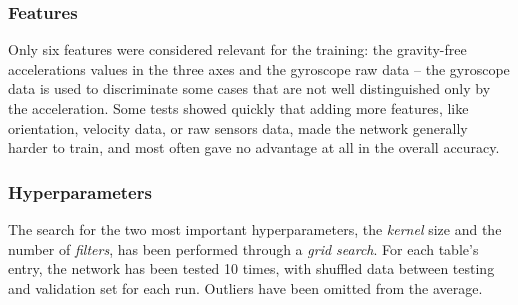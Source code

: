 \subsubsection{Features}
Only six features were considered relevant for the training: the gravity-free accelerations values in the three axes and the gyroscope raw data – the gyroscope data is used to discriminate some cases that are not well distinguished only by the acceleration. Some tests showed quickly that adding more features, like orientation, velocity data, or raw sensors data, made the network generally harder to train, and most often gave no advantage at all in the overall accuracy.

\subsubsection{Hyperparameters}
The search for the two most important hyperparameters, the \textit{kernel} size and the number of \textit{filters}, has been performed through a \textit{grid search}. For each table's entry, the network has been tested 10 times, with shuffled data between testing and validation set for each run. Outliers have been omitted from the average.

